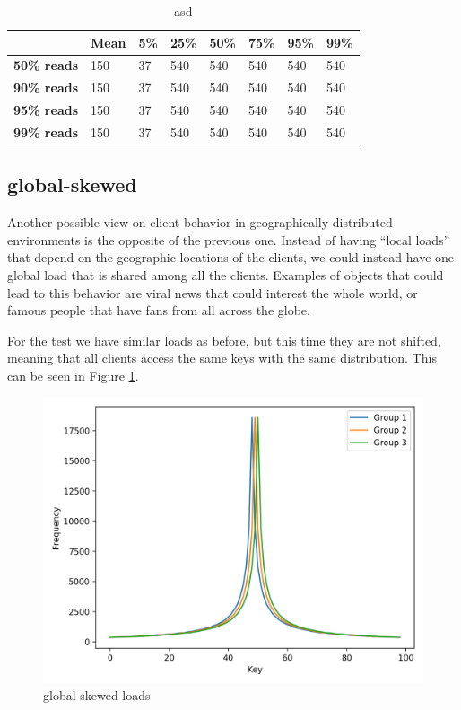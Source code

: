 \begin{table}[!htb]
  \centering
  \begin{tabular}{l l l l l l l l}
    \hline
    & \textbf{Mean} & \textbf{5\%} & \textbf{25\%} & \textbf{50\%} & \textbf{75\%} & \textbf{95\%}& \textbf{99\%} \\
    \hline
    \textbf{50\% reads} & 150 & 37 & 540 & 540 & 540 & 540 & 540 \\
    \textbf{90\% reads} & 150 & 37 & 540 & 540 & 540 & 540 & 540 \\
    \textbf{95\% reads} & 150 & 37 & 540 & 540 & 540 & 540 & 540 \\
    \textbf{99\% reads} & 150 & 37 & 540 & 540 & 540 & 540 & 540 \\
    \hline
  \end{tabular}
  \caption{asd}\label{tab:local-latencies-table}
\end{table}


\subsection{global-skewed}\label{sec:global-skewed}
Another possible view on client behavior in geographically distributed environments is the opposite of the previous one. Instead of having ``local loads'' that depend on the geographic locations of the clients, we could instead have one global load that is shared among all the clients. Examples of objects that could lead to this behavior are viral news that could interest the whole world, or famous people that have fans from all across the globe.

For the test we have similar loads as before, but this time they are not shifted, meaning that all clients access the same keys with the same distribution. This can be seen in Figure \ref{fig:global-skewed-loads}.

\begin{figure}[!htb]
  \centering
  \includegraphics[width=\textwidth,height=\textheight,keepaspectratio]{img/clients_loads_global.png}
  \caption[caption]{ global-skewed-loads }
  \label{fig:global-skewed-loads}
\end{figure}

